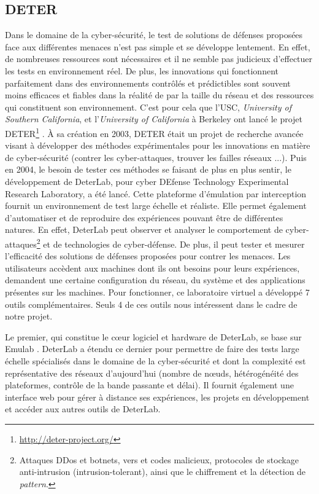 \subsection{DETER}
\label{subsection:DETER}

Dans le domaine de la cyber-sécurité, le test de solutions de défenses proposées
face aux différentes menaces n'est pas simple et se développe lentement. En
effet, de nombreuses ressources sont nécessaires et il ne semble pas judicieux
d'effectuer les tests en environnement réel. De plus, les innovations qui
fonctionnent parfaitement dans des environnements contrôlés et prédictibles sont
souvent moins efficaces et fiables dans la réalité de par la taille du réseau et
des ressources qui constituent son environnement.  C'est pour cela que
l'USC, \textit{University of Southern California}, et l'\textit{University of California} à Berkeley ont
lancé le projet DETER\footnote{\url{http://deter-project.org/}} \citep{DETER_benzel2011science,
  DETER_mirkovic2010deter}. À sa création en 2003, DETER était un projet de
recherche avancée visant à développer des méthodes expérimentales pour les
innovations en matière de cyber-sécurité (contrer les cyber-attaques, trouver
les failles réseaux ...). Puis en 2004, le besoin de tester ces méthodes se
faisant de plus en plus sentir, le développement de DeterLab, pour cyber DEfense
Technology Experimental Research Laboratory, a été lancé. Cette plateforme
d'émulation par interception fournit un environnement de test
large échelle et réaliste. Elle permet également d'automatiser et de reproduire
des expériences pouvant être de différentes natures. En effet, DeterLab peut
observer et analyser le comportement de cyber-attaques\footnote{ Attaques DDos et
  botnets, vers et codes malicieux, protocoles de stockage anti-intrusion
  (intrusion-tolerant), ainsi que le chiffrement et la détection de
  \textit{pattern}.} et de technologies de cyber-défense. De plus, il peut
tester et mesurer l'efficacité des solutions de défenses proposées pour contrer
les menaces. Les utilisateurs accèdent aux machines dont ils ont besoins pour
leurs expériences, demandent une certaine configuration du réseau, du système et
des applications présentes sur les machines. Pour fonctionner, ce laboratoire
virtuel a développé 7 outils complémentaires. Seuls 4 de ces outils nous intéressent
dans le cadre de notre projet.

Le premier, qui constitue le c\oe ur logiciel et hardware de DeterLab, se base
sur Emulab \citep{EMULAB_INIT}. DeterLab a étendu ce dernier pour permettre de
faire des tests large échelle spécialisés dans le domaine de la cyber-sécurité
et dont la complexité est représentative des réseaux d'aujourd'hui (nombre de
n\oe uds, hétérogénéité des plateformes, contrôle de la bande passante et
délai). Il fournit également une interface web pour gérer à distance ses
expériences, les projets en développement et accéder aux autres outils de
DeterLab.

